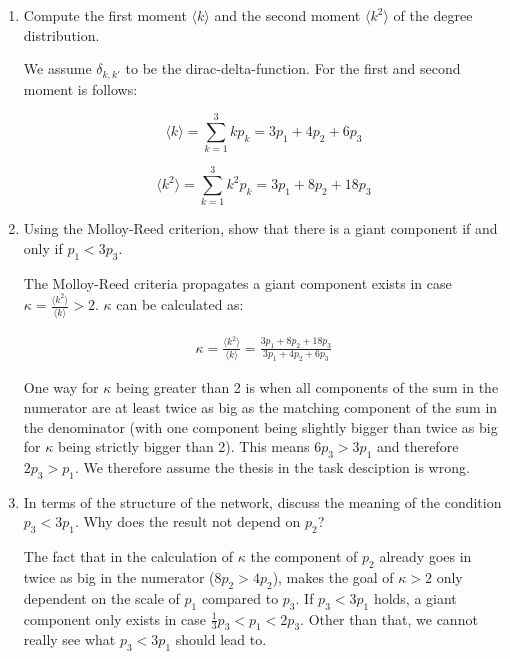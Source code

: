 \begin{enumerate}
	\item Compute the first moment $\langle k \rangle$ and the second moment $\langle k^2 \rangle$ of the degree distribution.
	
	We assume $\delta_{k,k'}$ to be the dirac-delta-function. For the first and second moment is follows:
	
	\begin{equation*}
			\langle k \rangle = \sum_{k = 1}^3 k p_k = 3p_1 + 4p_2 + 6p_3
	\end{equation*}

	\begin{equation*}
			\langle k^2 \rangle = \sum_{k = 1}^3 k^2 p_k = 3p_1 + 8p_2 + 18p_3
	\end{equation*}
	
	\item Using the Molloy-Reed criterion, show that there is a giant component if and only if $p_1 < 3p_3$.
	
	The Molloy-Reed criteria propagates a giant component exists in case $\kappa = \frac{\langle k^2 \rangle}{\langle k \rangle} > 2$. $\kappa$ can be calculated as:
	
	\begin{equation*}
		\begin{split}
			\kappa = \frac{\langle k^2 \rangle}{\langle k \rangle} = \frac{3p_1 + 8p_2 + 18p_3}{3p_1 + 4p_2 + 6p_3}
		\end{split}
	\end{equation*}

	One way for $\kappa$ being greater than 2 is when all components of the sum in the numerator are at least twice as big as the matching component of the sum in the denominator (with one component being slightly bigger than twice as big for $\kappa$ being strictly bigger than 2). This means $6p_3 > 3p_1$ and therefore $2p_3 > p_1$. We therefore assume the thesis in the task desciption is wrong. 
	
	\item In terms of the structure of the network, discuss the meaning of the condition $p_3 < 3p_1$. Why does the result not depend on $p_2$?
	
	The fact that in the calculation of $\kappa$ the component of $p_2$ already goes in twice as big in the numerator ($8p_2 > 4p_2$), makes the goal of $\kappa > 2$ only dependent on the scale of $p_1$ compared to $p_3$. If $p_3 < 3p_1$ holds, a giant component only exists in case $\frac{1}{3}p_3 < p_1 < 2p_3$. Other than that, we cannot really see what $p_3 < 3p_1$ should lead to.
	
\end{enumerate}